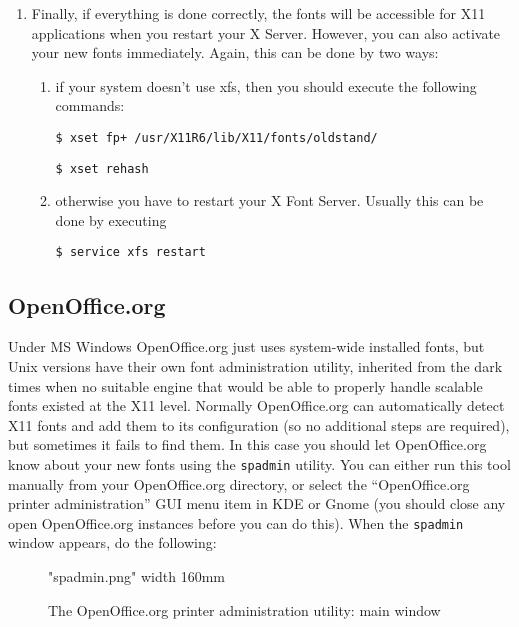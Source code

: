 \documentclass[12pt,a4paper,openany]{book}
\begin{document}
\begin{enumerate}
\begin{enumerate}
\end{enumerate}

\item Finally, if everything is done correctly, the fonts will be
accessible for X11 applications when you restart your X Server. However,
you can also activate your new fonts immediately. Again, this can be done
by two ways:

\begin{enumerate}

\item if your system doesn’t use xfs, then you should execute the following
commands:

\texttt{\$ xset fp+ /usr/X11R6/lib/X11/fonts/oldstand/}

\texttt{\$ xset rehash}

\item otherwise you have to restart your X Font Server. Usually this
can be done by executing

\texttt{\$ service xfs restart}

\end{enumerate}

\end{enumerate}

\subsection{OpenOffice.org}

Under MS Windows OpenOffice.org just uses system-wide installed fonts, but
Unix versions have their own font administration utility, inherited from
the dark times when no suitable engine that would be able to properly
handle scalable fonts existed at the X11 level. Normally OpenOffice.org can
automatically detect X11 fonts and add them to its configuration (so no
additional steps are required), but sometimes it fails to find them. In this 
case you should let OpenOffice.org know about your new fonts using the
\texttt{spadmin} utility. You can either run this tool manually from your 
OpenOffice.org directory, or select the “OpenOffice.org printer administration”
GUI menu item in KDE or Gnome (you should close any open OpenOffice.org 
instances before you can do this). When the \texttt{spadmin} window appears, 
do the following:

\begin{figure}[htb]

\centerline{\XeTeXpicfile "spadmin.png" width 160mm}

\caption{The OpenOffice.org printer administration utility: main window}

\hypertarget{fig:spadmin}{}\label{fig:spadmin}

\end{figure}
\end{document}
